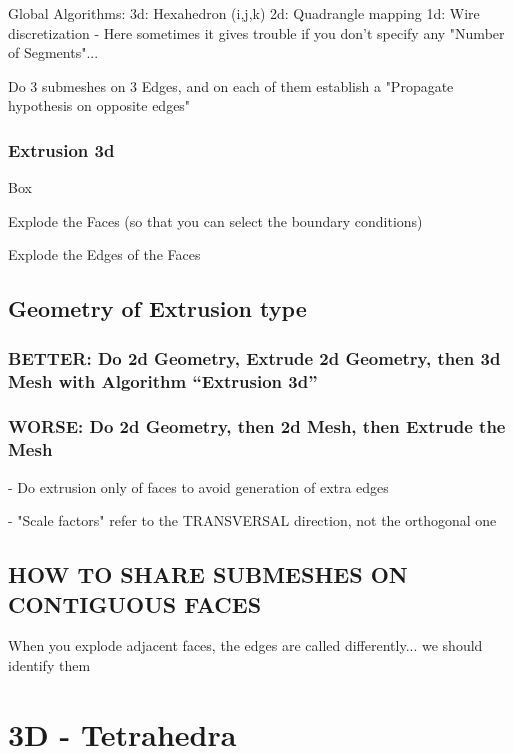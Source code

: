 \documentclass[10pt]{book}
\begin{document}
   Global Algorithms:
    3d: Hexahedron (i,j,k)
    2d: Quadrangle mapping
    1d: Wire discretization  - Here sometimes it gives trouble if you don't specify any "Number of Segments"...
    
    Do 3 submeshes on 3 Edges, and on each of them establish a "Propagate hypothesis on opposite edges"
   
    
  \subsubsection{Extrusion 3d}
  
  
  Box
  
  Explode the Faces (so that you can select the boundary conditions)
  
  Explode the Edges of the Faces
  
  
  
 \subsection{Geometry of Extrusion type}
 
  
  \subsubsection{BETTER: Do 2d Geometry, Extrude 2d Geometry, then 3d Mesh with Algorithm ``Extrusion 3d''}
  
  
  \subsubsection{WORSE: Do 2d Geometry, then 2d Mesh, then Extrude the Mesh}
 
 
 - Do extrusion only of faces to avoid generation of extra edges    

  - "Scale factors" refer to the TRANSVERSAL direction, not the orthogonal one



\subsection{HOW TO SHARE SUBMESHES ON CONTIGUOUS FACES}


When you explode adjacent faces, the edges are called differently... we should identify them

 
 
  \section{3D - Tetrahedra}
  
\end{document}
